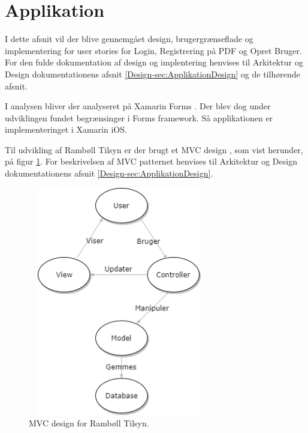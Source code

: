 \section{Applikation}
I dette afsnit vil der blive gennemgået design, brugergrænseflade og implementering for user stories for Login, Registrering på PDF og Opret Bruger. For den fulde dokumentation af design og implentering henvises til Arkitektur og Design dokumentationens afsnit \ref{Design-sec:ApplikationDesign} og de tilhørende afsnit.

I analysen bliver der analyseret på Xamarin Forms \cite{Forms}. Der blev dog under udviklingen fundet begrænsinger i Forms framework. Så applikationen er implementeringet i Xamarin iOS.

Til udvikling af Rambøll Tilsyn er der brugt et MVC design \cite{MVC}, som vist herunder, på figur \ref{fig:MVC}. For beskrivelsen af MVC patternet henvises til Arkitektur og Design dokumentationens afsnit \ref{Design-sec:ApplikationDesign}.
\begin{figure}[H] %
	\centering
	\includegraphics[height=10cm, width=8cm]{Design/Applikation/MVC}
	\caption{MVC design for Rambøll Tilsyn.}
	\label{fig:MVC}
\end{figure}

\clearpage





